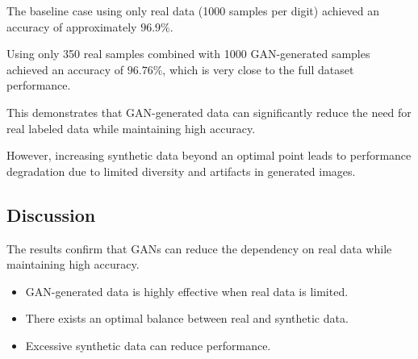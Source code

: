 The baseline case using only real data (1000 samples per digit) achieved an accuracy of approximately $96.9\%$.

Using only 350 real samples combined with 1000 GAN-generated samples achieved an accuracy of $96.76\%$, which is very close to the full dataset performance.

This demonstrates that GAN-generated data can significantly reduce the need for real labeled data while maintaining high accuracy.

However, increasing synthetic data beyond an optimal point leads to performance degradation due to limited diversity and artifacts in generated images.

\subsection{Discussion}

The results confirm that GANs can reduce the dependency on real data while maintaining high accuracy.

\begin{itemize}
    \item GAN-generated data is highly effective when real data is limited.
    \item There exists an optimal balance between real and synthetic data.
    \item Excessive synthetic data can reduce performance.
\end{itemize}

\endgroup